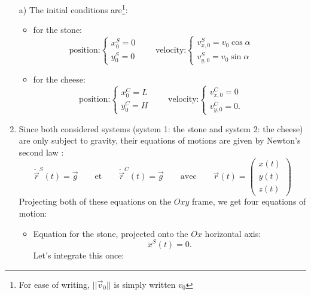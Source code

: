 \begin{enumerate}
\item[a)] The initial conditions are\footnote{For ease of writing, $||\vec{v}_0||$ is simply written $v_0$}:\\
\begin{itemize}
\item for the stone: \\
\begin{displaymath}
\textrm{position:}
\left\{ \begin{array}{l}
x_0^S = 0 \\
y_0^S = 0
\end{array}\right.\qquad
\textrm{velocity:}
\left\{ \begin{array}{l}
v_{x,0}^S = v_0\cos\alpha\\
v_{y,0}^S = v_0\sin\alpha
\end{array}\right.\qquad
\end{displaymath}
\item for the cheese: \\
\begin{displaymath}
\textrm{position:}
\left\{ \begin{array}{l}
x_0^C = L \\
y_0^C = H
\end{array}\right.\qquad
\textrm{velocity:}
\left\{ \begin{array}{l}
v_{x,0}^C = 0\\
v_{y,0}^C = 0.
\end{array}\right.\qquad
\end{displaymath}
\end{itemize}
\item Since both considered systems (system 1: the stone and system 2: the cheese) are only subject to gravity, their equations of motions are given by Newton's second law : 
\[
\ddot{\vec{r}}^S(t) = \vec{g} \qquad \textrm{et} \qquad \ddot{\vec{r}}^C(t) = \vec{g} \qquad \textrm{avec} \qquad \vec{r}(t)=\left(\begin{array}{c}x(t)\\y(t)\\z(t)\end{array}\right)
\]
Projecting both of these equations on the $Oxy$ frame, we get four equations of motion:\\
\begin{itemize}
\item Equation for the stone, projected onto the $Ox$ horizontal axis: 
\[
\ddot{x}^S(t) = 0.
\]
Let's integrate this once:

\end{itemize}
\end{enumerate}

